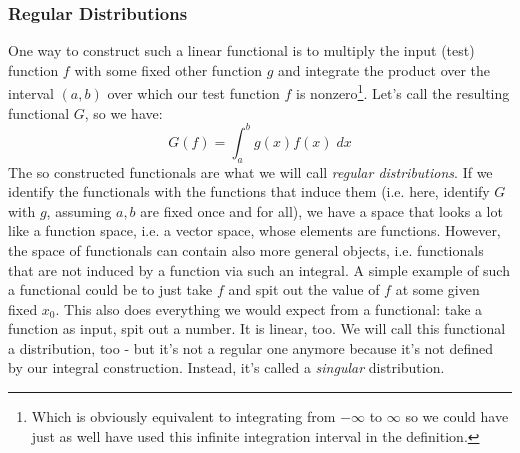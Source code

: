 \subsubsection{Regular Distributions}
One way to construct such a linear functional is to multiply the input (test) function $f$ with some fixed other function $g$ and integrate the product over the interval $(a,b)$ over which our test function $f$ is nonzero\footnote{Which is obviously equivalent to integrating from $-\infty$ to $\infty$ so we could have just as well have used this infinite integration interval in the definition.}. Let's call the resulting functional $G$, so we have:
\begin{equation}
 G(f) = \int_a^b g(x) f(x) \; dx
\end{equation}
The so constructed functionals are what we will call \emph{regular distributions}. If we identify the functionals with the functions that induce them (i.e. here, identify $G$ with $g$, assuming $a,b$ are fixed once and for all), we have a space that looks a lot like a function space, i.e. a vector space, whose elements are functions. However, the space of functionals can contain also more general objects, i.e. functionals that are not induced by a function via such an integral. A simple example of such a functional could be to just take $f$ and spit out the value of $f$ at some given fixed $x_0$. This also does everything we would expect from a functional: take a function as input, spit out a number. It is linear, too. We will call this functional a distribution, too - but it's not a regular one anymore because it's not defined by our integral construction. Instead, it's called a \emph{singular} distribution.





